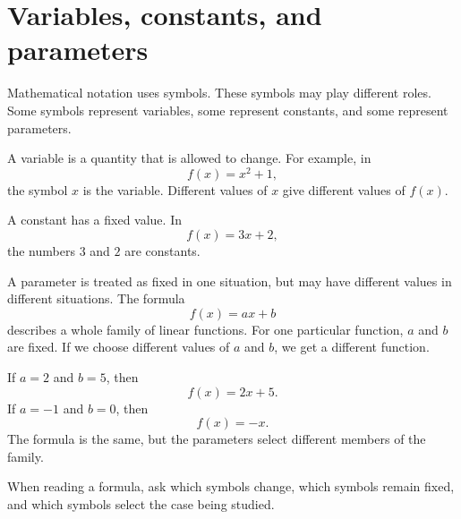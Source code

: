 \section{Variables, constants, and parameters}

Mathematical notation uses symbols. These symbols may play different roles. Some symbols represent variables, some represent constants, and some represent parameters.

A variable is a quantity that is allowed to change. For example, in
\[
f(x)=x^2+1,
\]
the symbol \(x\) is the variable. Different values of \(x\) give different values of \(f(x)\).

A constant has a fixed value. In
\[
f(x)=3x+2,
\]
the numbers \(3\) and \(2\) are constants.

A parameter is treated as fixed in one situation, but may have different values in different situations. The formula
\[
f(x)=ax+b
\]
describes a whole family of linear functions. For one particular function, \(a\) and \(b\) are fixed. If we choose different values of \(a\) and \(b\), we get a different function.

\begin{examplebox}
If \(a=2\) and \(b=5\), then
\[
f(x)=2x+5.
\]
If \(a=-1\) and \(b=0\), then
\[
f(x)=-x.
\]
The formula is the same, but the parameters select different members of the family.
\end{examplebox}

When reading a formula, ask which symbols change, which symbols remain fixed, and which symbols select the case being studied.
